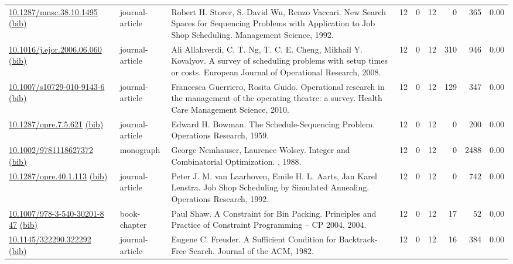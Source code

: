 {\begin{longtable}{p{5cm}lp{11cm}rrrrrr}
\href{http://dx.doi.org/10.1287/mnsc.38.10.1495}{10.1287/mnsc.38.10.1495} \href{https://www.doi2bib.org/bib/10.1287/mnsc.38.10.1495}{(bib)} & journal-article & Robert H. Storer, S. David Wu, Renzo Vaccari. New Search Spaces for Sequencing Problems with Application to Job Shop Scheduling. Management Science, 1992. & 12 & 0 & 12 & 0 & 365 &  0.00\\
\href{http://dx.doi.org/10.1016/j.ejor.2006.06.060}{10.1016/j.ejor.2006.06.060} \href{https://www.doi2bib.org/bib/10.1016/j.ejor.2006.06.060}{(bib)} & journal-article & Ali Allahverdi, C. T. Ng, T. C. E. Cheng, Mikhail Y. Kovalyov. A survey of scheduling problems with setup times or costs. European Journal of Operational Research, 2008. & 12 & 0 & 12 & 310 & 946 &  0.00\\
\href{http://dx.doi.org/10.1007/s10729-010-9143-6}{10.1007/s10729-010-9143-6} \href{https://www.doi2bib.org/bib/10.1007/s10729-010-9143-6}{(bib)} & journal-article & Francesca Guerriero, Rosita Guido. Operational research in the management of the operating theatre: a survey. Health Care Management Science, 2010. & 12 & 0 & 12 & 129 & 347 &  0.00\\
\href{http://dx.doi.org/10.1287/opre.7.5.621}{10.1287/opre.7.5.621} \href{https://www.doi2bib.org/bib/10.1287/opre.7.5.621}{(bib)} & journal-article & Edward H. Bowman. The Schedule-Sequencing Problem. Operations Research, 1959. & 12 & 0 & 12 & 0 & 200 &  0.00\\
\href{http://dx.doi.org/10.1002/9781118627372}{10.1002/9781118627372} \href{https://www.doi2bib.org/bib/10.1002/9781118627372}{(bib)} & monograph & George Nemhauser, Laurence Wolsey. Integer and Combinatorial Optimization. , 1988. & 12 & 0 & 12 & 0 & 2488 &  0.00\\
\href{http://dx.doi.org/10.1287/opre.40.1.113}{10.1287/opre.40.1.113} \href{https://www.doi2bib.org/bib/10.1287/opre.40.1.113}{(bib)} & journal-article & Peter J. M. van Laarhoven, Emile H. L. Aarts, Jan Karel Lenstra. Job Shop Scheduling by Simulated Annealing. Operations Research, 1992. & 12 & 0 & 12 & 0 & 742 &  0.00\\
\href{http://dx.doi.org/10.1007/978-3-540-30201-8_47}{10.1007/978-3-540-30201-8 47} \href{https://www.doi2bib.org/bib/10.1007/978-3-540-30201-8_47}{(bib)} & book-chapter & Paul Shaw. A Constraint for Bin Packing. Principles and Practice of Constraint Programming – CP 2004, 2004. & 12 & 0 & 12 & 17 & 52 &  0.00\\
\href{http://dx.doi.org/10.1145/322290.322292}{10.1145/322290.322292} \href{https://www.doi2bib.org/bib/10.1145/322290.322292}{(bib)} & journal-article & Eugene C. Freuder. A Sufficient Condition for Backtrack-Free Search. Journal of the ACM, 1982. & 12 & 0 & 12 & 16 & 384 &  0.00\\

\end{longtable}}
